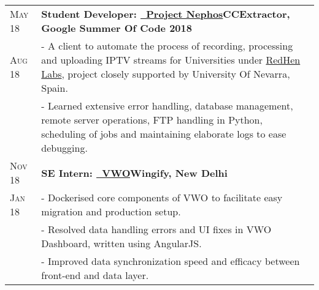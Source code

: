 \documentclass[a4paper,10pt]{extarticle} %
\begin{document}
\begin{tabularx}{\linewidth}{ l | X }

\textsc{May 18} & \textbf{Student Developer: {\href{https://github.com/thealphadollar/Nephos}{\ Project Nephos}}}\hfill\textbf{CCExtractor, Google Summer Of Code 2018}\\
\textsc{Aug 18}& {- A client to automate the process of recording, processing and uploading IPTV streams for Universities under \href{http://www.redhenlab.org/}{RedHen Labs}, project closely supported by University Of Nevarra, Spain.}\\
& {- Learned extensive error handling, database management, remote server operations, FTP handling in Python, scheduling of jobs and maintaining elaborate logs to ease debugging.}\\

\textsc{Nov 18} & \textbf{SE Intern: {\href{https://vwo.com/}{\ VWO}}}\hfill\textbf{Wingify, New Delhi}\\
\textsc{Jan 18}& {- Dockerised core components of VWO to facilitate easy migration and production setup.}\\
& {- Resolved data handling errors and UI fixes in VWO Dashboard, written using AngularJS.}\\
& {- Improved data synchronization speed and efficacy between front-end and data layer.}\\

\end{tabularx}

\vspace{-0.1cm}
\end{document}
